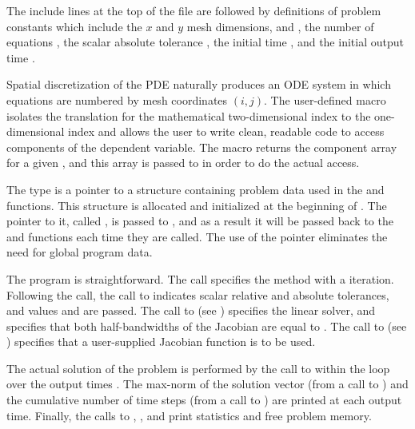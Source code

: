 The include lines at the top of the file are followed by definitions of
problem constants which include the $x$ and $y$ mesh dimensions,  and
, the number of equations , the scalar absolute tolerance
, the initial time , and the initial output time .

Spatial discretization of the PDE naturally produces an ODE system in
which equations are numbered by mesh coordinates $(i,j)$. The
user-defined macro  isolates the translation for the
mathematical two-dimensional index to the one-dimensional
 index and allows the user to write clean, readable code
to access components of the dependent variable.  The 
macro returns the component array for a given , and this
array is passed to  in order to do the actual 
access.

The type  is a pointer to a structure containing problem
data used in the  and  functions.  This structure is
allocated and initialized at the beginning of . The pointer
to it, called , is passed to , and as a
result it will be passed back to the  and  functions
each time they are called.  The use of the  pointer
eliminates the need for global program data.

The  program is straightforward.  The  call specifies
the  method with a  iteration. Following the
 call, the call to  indicates scalar
relative and absolute tolerances, and values  and  are passed.
The call to  (see ) specifies the {\cvband}
linear solver, and specifies that both half-bandwidths of the Jacobian
are equal to .  
The call to  (see ) specifies
that a user-supplied Jacobian function  is to be used.

The actual solution of the problem is performed by
the call to  within the loop over the output times .
The max-norm of the solution vector (from a call to ) and
the cumulative number of time steps (from a call to ) are
printed at each output time. Finally, the calls to ,
, and  print statistics and free problem memory.

